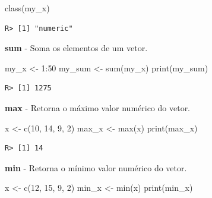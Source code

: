 \documentclass[
  11pt,
]{book}
\newenvironment{Shaded}{\begin{snugshade}}{\end{snugshade}}
\newcommand{\DecValTok}[1]{\textcolor[rgb]{0.06,0.06,0.06}{#1}}
\newcommand{\FunctionTok}[1]{\textcolor[rgb]{0,0,0}{#1}}
\newcommand{\NormalTok}[1]{#1}
\newcommand{\OtherTok}[1]{\textcolor[rgb]{0.37,0.37,0.37}{#1}}
\newcommand{\SpecialCharTok}[1]{\textcolor[rgb]{0,0,0}{#1}}
\begin{document}
\begin{Shaded}
\begin{Highlighting}[]
\FunctionTok{class}\NormalTok{(my\_x)}
\end{Highlighting}
\end{Shaded}

\begin{verbatim}
R> [1] "numeric"
\end{verbatim}

\textbf{sum} - Soma os elementos de um vetor.

\begin{Shaded}
\begin{Highlighting}[]
\NormalTok{my\_x }\OtherTok{\textless{}{-}} \DecValTok{1}\SpecialCharTok{:}\DecValTok{50}
\NormalTok{my\_sum }\OtherTok{\textless{}{-}} \FunctionTok{sum}\NormalTok{(my\_x)}
\FunctionTok{print}\NormalTok{(my\_sum)}
\end{Highlighting}
\end{Shaded}

\begin{verbatim}
R> [1] 1275
\end{verbatim}

\textbf{max} - Retorna o máximo valor numérico do vetor.

\begin{Shaded}
\begin{Highlighting}[]
\NormalTok{x }\OtherTok{\textless{}{-}} \FunctionTok{c}\NormalTok{(}\DecValTok{10}\NormalTok{, }\DecValTok{14}\NormalTok{, }\DecValTok{9}\NormalTok{, }\DecValTok{2}\NormalTok{)}
\NormalTok{max\_x }\OtherTok{\textless{}{-}} \FunctionTok{max}\NormalTok{(x)}
\FunctionTok{print}\NormalTok{(max\_x)}
\end{Highlighting}
\end{Shaded}

\begin{verbatim}
R> [1] 14
\end{verbatim}

\textbf{min} - Retorna o mínimo valor numérico do vetor.

\begin{Shaded}
\begin{Highlighting}[]
\NormalTok{x }\OtherTok{\textless{}{-}} \FunctionTok{c}\NormalTok{(}\DecValTok{12}\NormalTok{, }\DecValTok{15}\NormalTok{, }\DecValTok{9}\NormalTok{, }\DecValTok{2}\NormalTok{)}
\NormalTok{min\_x }\OtherTok{\textless{}{-}} \FunctionTok{min}\NormalTok{(x)}
\FunctionTok{print}\NormalTok{(min\_x)}
\end{Highlighting}
\end{Shaded}
\end{document}
